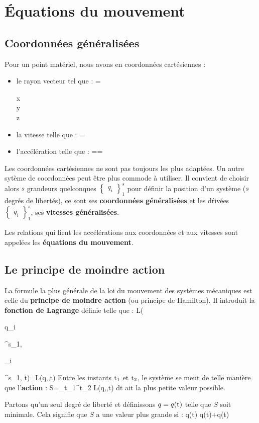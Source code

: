 \chapter{\'Equations du mouvement}
\section{Coordonn\'ees g\'en\'eralis\'ees}

Pour un point mat\'eriel, nous avons en coordonn\'ees cart\'esiennes :
\begin{itemize}
\item le rayon vecteur tel que :
	\be
		=\begin{pmatrix} x \\ y \\ z \end{pmatrix}
	\ee
\item la vitesse telle que :
	\be
		=
	\ee
\item l'acc\'el\'eration telle que :
	\be
		==
	\ee
\end{itemize}

Les coordonn\'ees cart\'esiennes ne sont pas toujours les plus adapt\'ees. Un autre syt\`eme de coordonn\'ees peut \^etre plus commode \`a utiliser. Il convient de choisir alors $s$ grandeurs quelconques $\begin{Bmatrix}q_{i}\end{Bmatrix}^{s}_{1}$ pour d\'efinir la position d'un syst\`eme ($s$ degr\'es de libert\'es), ce sont ses \textbf{coordonn\'ees g\'en\'eralis\'ees} et les d\'riv\'ees $\begin{Bmatrix}\dot{q}_{i}\end{Bmatrix}^{s}_{1}$, ses \textbf{vitesses g\'en\'eralis\'ees}.

Les relations qui lient les acc\'el\'erations aux coordonn\'ees et aux vitesses sont appel\'ees les \textbf{\'equations du mouvement}.

\section{Le principe de moindre action}

La formule la plus g\'en\'erale de la loi du mouvement des syst\`emes mécaniques est celle du \textbf{principe de moindre action} (ou principe de Hamilton). Il introduit la \textbf{fonction de Lagrange} d\'efinie telle que :
\be
	L(\begin{Bmatrix}q_{i}\end{Bmatrix}^{s}_{1},\begin{Bmatrix}_{i}\end{Bmatrix}^{s}_{1}, {\rm t})=L(q,,{\rm t})
\ee
Entre les instants ${\rm t}_{1}$ et ${\rm t}_{2}$, le système se meut de telle mani\`ere que l'\textbf{action} :
\be
	S=\int_{{\rm t}_{1}}^{{\rm t}_{2}} L(q,,{\rm t}) d{\rm t} \label{EQ:2_1}
\ee
ait la plus petite valeur possible.

Partons qu'un seul degr\'e de libert\'e et d\'efinissons $q=q({\rm t})$ telle que $S$ soit minimale. Cela signifie que $S$ a une valeur plus grande si :
\be
	q({\rm t}) \rightarrow q({\rm t})+\delta q({\rm t}) \label{EQ:2_2}
\ee
